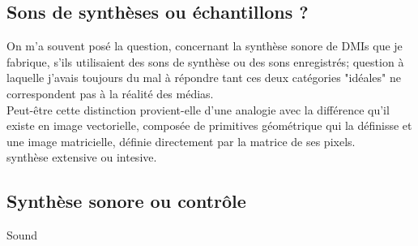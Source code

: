 
\subsection{Sons de synthèses ou échantillons ?}

\noindent On m'a souvent posé la question, concernant la synthèse sonore de DMIs que je fabrique, s'ils utilisaient des sons de synthèse ou des sons enregistrés; question à laquelle j'avais toujours du mal à répondre tant ces deux catégories "idéales" ne correspondent pas à la réalité des médias.\\
\indent Peut-être cette distinction provient-elle d'une analogie avec la différence qu'il existe en image vectorielle, composée de primitives géométrique qui la définisse et une image matricielle, définie directement par la matrice de ses pixels.\\
synthèse extensive ou intesive.


\subsection{Synthèse sonore ou contrôle}

Sound  \cite{di_scipio_sound_2003}

